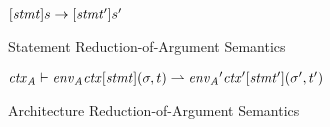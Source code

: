 \documentclass[UTF8]{article}
\begin{document}
\begin{figure}[ht!]
\begin{ottdefnblock}{$[  \mathit{stmt}  ]  s  \rightarrow  [  \mathit{stmt'}  ]  s'$}{}
\ottusedrule{\ottdrulestmtXXretXXe{}}
\ottusedrule{\ottdrulestmtXXassXXe{}}
\ottusedrule{\ottdrulestmtXXcondXXe{}}
\ottusedrule{\ottdrulestmtXXverifyXXeOne{}}
\ottusedrule{\ottdrulestmtXXverifyXXeTwo{}}
\end{ottdefnblock}
\caption{Statement Reduction-of-Argument Semantics}
\label{fig:semstmt2}
\end{figure}

\begin{figure}[ht!]
\begin{ottdefnblock}[#1]{$ { \mathit{ctx}_\mathit{A} }  \vdash  { \mathit{env}_\mathit{A} }   \mathit{ctx}  [  \mathit{stmt}  ] (  \sigma  ,  t  ) \rightharpoonup  { \mathit{env}_\mathit{A} }'   \mathit{ctx}'  [  \mathit{stmt'}  ] (  \sigma'  ,  t'  ) $}{}
\ottusedrule{\ottdrulearchXXpblockXXargs{}}
\ottusedrule{\ottdrulearchXXffblockXXargs{}}
\end{ottdefnblock}
\caption{Architecture Reduction-of-Argument Semantics}
\label{fig:semarch2}
\end{figure}
\end{document}
